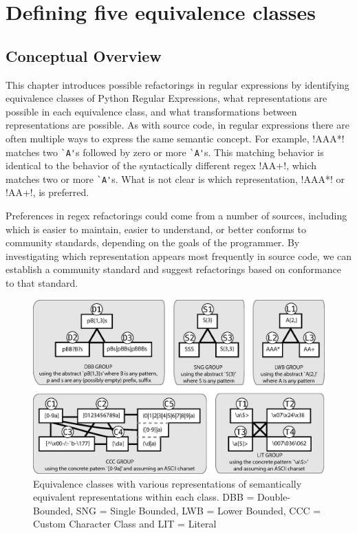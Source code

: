 \section{Defining five equivalence classes}

\subsection{Conceptual Overview}
This chapter introduces possible refactorings in regular expressions by identifying equivalence classes of Python Regular Expressions, what representations are possible in each equivalence class, and what transformations between representations are possible. As with source code, in regular expressions there are often multiple ways to express the same semantic concept.
For example, \cverb!AAA*! matches two \verb!`A'!s followed by zero or more \verb!`A'!s.  This matching behavior is identical to the behavior of the syntactically different regex \cverb!AA+!, which matches two or more \verb!`A'!s.  What is not clear is which representation,  \cverb!AAA*!  or  \cverb!AA+!, is preferred.

Preferences in regex refactorings could come from a number of sources, including which is easier to maintain, easier to understand, or better conforms to community standards, depending on the goals of the programmer.  By investigating which representation appears most frequently in source code, we can establish a community standard and suggest refactorings based on conformance to that standard.


\begin{figure}[tb]
\centering
\includegraphics[width=\textwidth]{nontex/illustrations/refactoringTree.eps}
\vspace{-12pt}
\caption{Equivalence classes with various representations of semantically equivalent representations within each class. DBB = Double-Bounded, SNG = Single Bounded, LWB = Lower Bounded, CCC = Custom Character Class and LIT = Literal}
\vspace{-6pt}
\label{fig:refactoringTree}
\end{figure}

